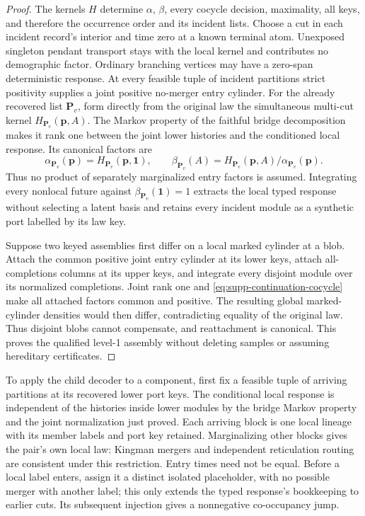\documentclass[11pt]{article}
\newcommand{\one}{\mathbf 1}
\begin{document}
\begin{proof}
The kernels $H$ determine $\alpha$, $\beta$, every cocycle decision, maximality, all keys, and therefore the occurrence order and its incident lists.  Choose a cut in each incident record's interior and time zero at a known terminal atom.  Unexposed singleton pendant transport stays with the local kernel and contributes no demographic factor.  Ordinary branching vertices may have a zero-span deterministic response.  At every feasible tuple of incident partitions strict positivity supplies a joint positive no-merger entry cylinder.  For the already recovered list $\mathbf P_v$, form directly from the original law the simultaneous multi-cut kernel $H_{\mathbf P_v}(\mathbf p,A)$.  The Markov property of the faithful bridge decomposition makes it rank one between the joint lower histories and the conditioned local response.  Its canonical factors are
\[
\alpha_{\mathbf P_v}(\mathbf p)
=H_{\mathbf P_v}(\mathbf p,\one),
\qquad
\beta_{\mathbf P_v}(A)
=H_{\mathbf P_v}(\mathbf p,A)/
 \alpha_{\mathbf P_v}(\mathbf p).
\]
Thus no product of separately marginalized entry factors is assumed.  Integrating every nonlocal future against $\beta_{\mathbf P_v}(\one)=1$ extracts the local typed response without selecting a latent basis and retains every incident module as a synthetic port labelled by its law key.

Suppose two keyed assemblies first differ on a local marked cylinder at a blob.  Attach the common positive joint entry cylinder at its lower keys, attach all-completions columns at its upper keys, and integrate every disjoint module over its normalized completions.  Joint rank one and \eqref{eq:supp-continuation-cocycle} make all attached factors common and positive.  The resulting global marked-cylinder densities would then differ, contradicting equality of the original law.  Thus disjoint blobs cannot compensate, and reattachment is canonical.  This proves the qualified level-1 assembly without deleting samples or assuming hereditary certificates.
\end{proof}

To apply the child decoder to a component, first fix a feasible tuple of
arriving partitions at its recovered lower port keys.  The conditional local
response is independent of the histories inside lower modules by the bridge
Markov property and the joint normalization just proved.  Each arriving
block is one local lineage with its member labels and port key retained.
Marginalizing other blocks gives the pair's own local law: Kingman mergers
and independent reticulation routing are consistent under this restriction.
Entry times need not be equal.  Before a local label enters, assign it a
distinct isolated placeholder, with no possible merger with another label;
this only extends the typed response's bookkeeping to earlier cuts.  Its
subsequent injection gives a nonnegative co-occupancy jump.
\end{document}
